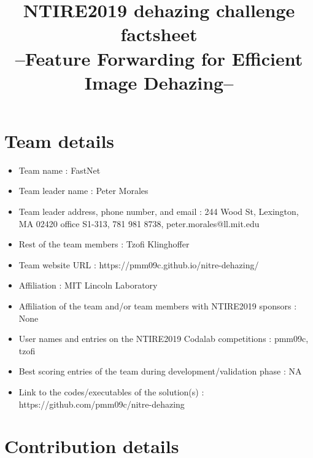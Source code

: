 \documentclass{article}
\title{NTIRE2019 dehazing challenge factsheet\\--Feature Forwarding for Efficient Image Dehazing--}
\begin{document}
\maketitle


\section{Team details}

\begin{itemize}
\item Team name : FastNet                                 
\item Team leader name : Peter Morales                          
\item Team leader address, phone number, and email : 244 Wood St, Lexington, MA 02420 office S1-313, 781 981 8738, peter.morales@ll.mit.edu
\item Rest of the team members : Tzofi Klinghoffer       
\item Team website URL : https://pmm09c.github.io/nitre-dehazing/                    
\item Affiliation : MIT Lincoln Laboratory
\item Affiliation of the team and/or team members with NTIRE2019 sponsors : None
\item User names and entries on the NTIRE2019 Codalab competitions : pmm09c, tzofi
\item Best scoring entries of the team during development/validation phase : NA
\item Link to the codes/executables of the solution(s) : https://github.com/pmm09c/nitre-dehazing
\end{itemize}

\section{Contribution details}
\end{document}
